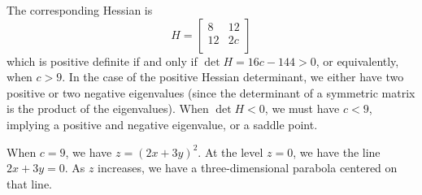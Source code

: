 \documentclass[a4paper]{article}
\begin{document}
\vspace{12pt}


The corresponding Hessian is
\[
	H = 
	\begin{bmatrix}
		8 & 12 \\
		12 & 2c \\
	\end{bmatrix}
\]
which is positive definite if and only if \(\det H = 16c - 144 > 0\), or equivalently, when \(c > 9\). In the case of the positive Hessian determinant, we either have two positive or two negative eigenvalues (since the determinant of a symmetric matrix is the product of the eigenvalues). When \(\det H < 0\), we must have \(c < 9\), implying a positive and negative eigenvalue, or a saddle point.

When \(c = 9\), we have \(z = \!\left( 2x + 3y \right)^{2}\). At the level \(z = 0\), we have the line \(2x + 3y = 0\). As \(z\) increases, we have a three-dimensional parabola centered on that line.

\vspace{12pt}

\end{document}

